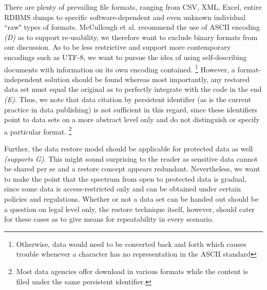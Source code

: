 \documentclass{acm_proc_article-sp}
\begin{document}
There are plenty of prevailing file formats, ranging from CSV, XML, Excel, entire RDBMS dumps to specific software-dependent and even unknown individual ``raw" types of formats.
McCullough et al. recommend the use of ASCII encoding \textit{(D)} as to support re-usability, we therefore want to exclude binary formats from our discussion.
As to be less restrictive and support more contemporary encodings such as UTF-8, we want to pursue the idea of using self-describing documents with information on its own encoding contained.
\footnote{Otherwise, data would need to be converted back and forth which causes trouble whenever a character has no representation in the ASCII standard}
However, a format-independent solution should be found whereas most importantly, any restored data set must equal the original as to perfectly integrate with the code in the end \textit{(E)}. 
Thus, we note that data citation by persistent identifier (as is the current practice in data publishing) is not sufficient in this regard, since these identifiers point to data sets on a more abstract level only and do not distinguish or specify a particular format.
\footnote{Most data agencies offer download in various formats while the content is filed under the same persistent identifier.}

  
Further, the data restore model should be applicable for protected data as well \textit{(supports G)}.
This might sound surprising to the reader as sensitive data cannot be shared per se and a restore concept appears redundant.
Nevertheless, we want to make the point that the spectrum from open to protected data is gradual, since some data is access-restricted only and can be obtained under certain policies and regulations.
Whether or not a data set can be handed out should be a question on legal level only, the restore technique itself, however, should cater for these cases as to give means for repeatability in every scenario.
\end{document}
